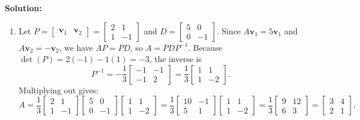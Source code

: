 \documentclass[11pt, letterpaper]{article}
\theoremstyle{definition}
\theoremstyle{remark}
\begin{document}
\textbf{Solution:}
\begin{enumerate}[label=(\alph*)]
    \item Let $P = \begin{bmatrix} \mathbf{v}_1 & \mathbf{v}_2 \end{bmatrix} = \begin{bmatrix} 2 & 1 \\ 1 & -1 \end{bmatrix}$ and $D = \begin{bmatrix} 5 & 0 \\ 0 & -1 \end{bmatrix}$. Since $A\mathbf{v}_1 = 5\mathbf{v}_1$ and $A\mathbf{v}_2 = -\mathbf{v}_2$, we have $AP = PD$, so $A = PDP^{-1}$. Because $\det(P) = 2(-1) - 1(1) = -3$, the inverse is
    \[
    P^{-1} = -\frac{1}{3}\begin{bmatrix} -1 & -1 \\ -1 & 2 \end{bmatrix} = \frac{1}{3}\begin{bmatrix} 1 & 1 \\ 1 & -2 \end{bmatrix}.
    \]
    Multiplying out gives:
    \[
    A = \frac{1}{3}\begin{bmatrix} 2 & 1 \\ 1 & -1 \end{bmatrix}\begin{bmatrix} 5 & 0 \\ 0 & -1 \end{bmatrix}\begin{bmatrix} 1 & 1 \\ 1 & -2 \end{bmatrix} = \frac{1}{3}\begin{bmatrix} 10 & -1 \\ 5 & 1 \end{bmatrix}\begin{bmatrix} 1 & 1 \\ 1 & -2 \end{bmatrix} = \frac{1}{3}\begin{bmatrix} 9 & 12 \\ 6 & 3 \end{bmatrix} = \begin{bmatrix} 3 & 4 \\ 2 & 1 \end{bmatrix}.
    \]


\end{enumerate}
\end{document}

